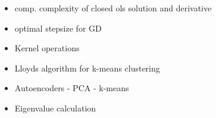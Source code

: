 \begin{itemize}
    \item comp. complexity of closed ols solution and derivative
    \item optimal stepsize for GD
    \item Kernel operations
    \item Lloyds algorithm for k-means clustering
    \item Autoencoders - PCA - k-means
    \item Eigenvalue calculation
\end{itemize}